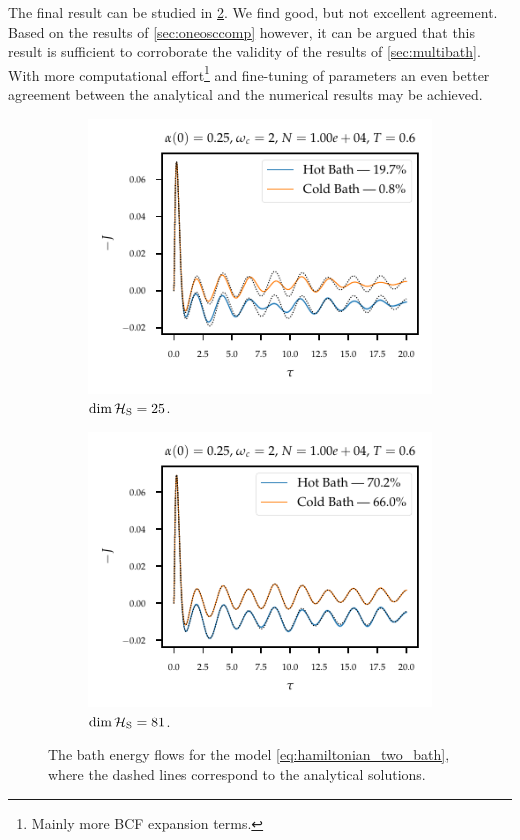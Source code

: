 The final result can be studied in \cref{fig:sufficient_levels}. We
find good, but not excellent agreement. Based on the results of
\cref{sec:oneosccomp} however, it can be argued that this result is
sufficient to corroborate the validity of the results of
\cref{sec:multibath}. With more computational effort\footnote{Mainly
  more BCF expansion terms.} and fine-tuning of parameters an even
better agreement between the analytical and the numerical results may
be achieved.
\begin{figure}[htp]
  \centering
  \begin{subfigure}[t]{.49\linewidth}
    \includegraphics{figs/analytic_comp/comparison_two_5bcf_5ho.pdf}
    \caption{\label{fig:insufficient_levels}\(\operatorname{dim}\mathcal{H}_{\mathrm{S}}=25\).}
  \end{subfigure}
  \begin{subfigure}[t]{.49\linewidth}
    \includegraphics{figs/analytic_comp/comparison_two_ho.pdf}
    \caption{\label{fig:sufficient_levels}\(\operatorname{dim}\mathcal{H}_{\mathrm{S}}=81\).}
  \end{subfigure}
  \caption{\label{fig:comp_two_bath} The bath energy flows for
    the model \cref{eq:hamiltonian_two_bath}, where the dashed lines
    correspond to the analytical solutions.}
\end{figure}


